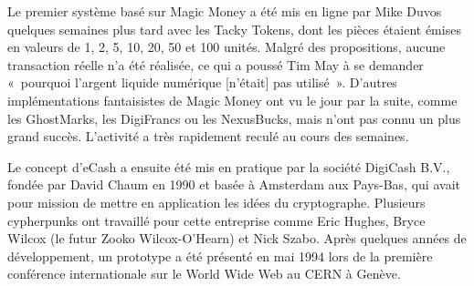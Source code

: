 Le premier système basé sur Magic Money a été mis en ligne par Mike Duvos quelques semaines plus tard avec les Tacky Tokens, dont les pièces étaient émises en valeurs de 1, 2, 5, 10, 20, 50 et 100 unités. Malgré des propositions, aucune transaction réelle n'a été réalisée, ce qui a poussé Tim May à se demander «~pourquoi l'argent liquide numérique [n'était] pas utilisé~». D'autres implémentations fantaisistes de Magic Money ont vu le jour par la suite, comme les GhostMarks, les DigiFrancs ou les NexusBucks, mais n'ont pas connu un plus grand succès. L'activité a très rapidement reculé au cours des semaines. %

Le concept d'eCash a ensuite été mis en pratique par la société DigiCash B.V., fondée par David Chaum en 1990 et basée à Amsterdam aux Pays-Bas, qui avait pour mission de mettre en application les idées du cryptographe. Plusieurs cypherpunks ont travaillé pour cette entreprise comme Eric Hughes, Bryce Wilcox (le futur Zooko Wilcox-O'Hearn) et Nick Szabo. Après quelques années de développement, un prototype a été présenté en mai 1994 lors de la première conférence internationale sur le World Wide Web au CERN à Genève.

